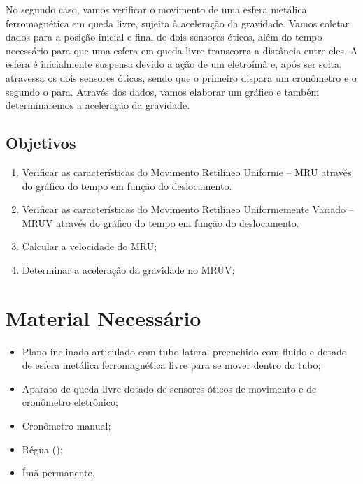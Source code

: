 No segundo caso, vamos verificar o movimento de uma esfera metálica ferromagnética em queda livre, sujeita à aceleração da gravidade. Vamos coletar dados para a posição inicial e final de dois sensores óticos, além do tempo necessário para que uma esfera em queda livre transcorra a distância entre eles. A esfera é inicialmente suspensa devido a ação de um eletroímã e, após ser solta, atravessa os dois sensores óticos, sendo que o primeiro dispara um cronômetro e o segundo o para. Através dos dados, vamos elaborar um gráfico e também determinaremos a aceleração da gravidade.

\subsection{Objetivos}

\begin{enumerate}
     \item Verificar as características do Movimento Retilíneo Uniforme -- MRU através do gráfico do tempo em função do deslocamento.
     \item Verificar as características do Movimento Retilíneo Uniformemente Variado -- MRUV através do gráfico do tempo em função do deslocamento.
     \item Calcular a velocidade do MRU;
     \item Determinar a aceleração da gravidade no MRUV;
\end{enumerate}

\section{Material Necessário}

\begin{itemize}
	\item Plano inclinado articulado com tubo lateral preenchido com fluido e dotado de esfera metálica ferromagnética livre para se mover dentro do tubo;
	\item Aparato de queda livre dotado de sensores óticos de movimento e de cronômetro eletrônico;
	\item Cronômetro manual;
	\item Régua ();
	\item Ímã permanente.
\end{itemize}

